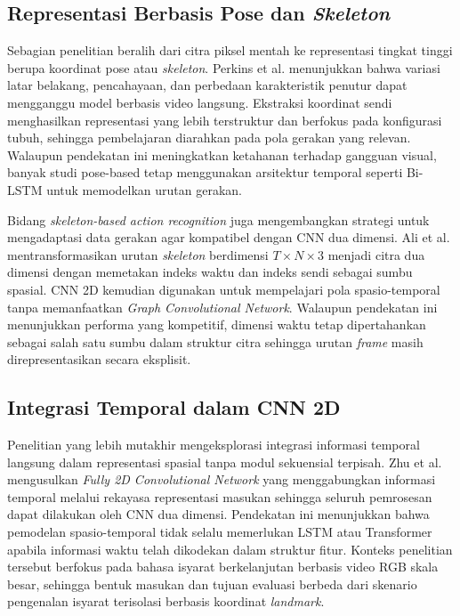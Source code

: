 \subsection{Representasi Berbasis Pose dan \textit{Skeleton}} \label{subsec:berbasis-pose}

Sebagian penelitian beralih dari citra piksel mentah ke representasi tingkat tinggi berupa koordinat pose atau \textit{skeleton}. 
Perkins et al. \cite{perkins2025islr} menunjukkan bahwa variasi latar belakang, pencahayaan, dan perbedaan karakteristik penutur dapat mengganggu model berbasis video langsung. 
Ekstraksi koordinat sendi menghasilkan representasi yang lebih terstruktur dan berfokus pada konfigurasi tubuh, sehingga pembelajaran diarahkan pada pola gerakan yang relevan. 
Walaupun pendekatan ini meningkatkan ketahanan terhadap gangguan visual, banyak studi pose-based tetap menggunakan arsitektur temporal seperti Bi-LSTM untuk memodelkan urutan gerakan.

Bidang \textit{skeleton-based action recognition} juga mengembangkan strategi untuk mengadaptasi data gerakan agar kompatibel dengan CNN dua dimensi. 
Ali et al. \cite{ali2023skeletonaction} mentransformasikan urutan \textit{skeleton} berdimensi $T \times N \times 3$ menjadi citra dua dimensi dengan memetakan indeks waktu dan indeks sendi sebagai sumbu spasial. 
CNN 2D kemudian digunakan untuk mempelajari pola spasio-temporal tanpa memanfaatkan \textit{Graph Convolutional Network}. 
Walaupun pendekatan ini menunjukkan performa yang kompetitif, dimensi waktu tetap dipertahankan sebagai salah satu sumbu dalam struktur citra sehingga urutan \textit{frame} masih direpresentasikan secara eksplisit.

\subsection{Integrasi Temporal dalam CNN 2D} \label{subsec:temporal-cnn}

Penelitian yang lebih mutakhir mengeksplorasi integrasi informasi temporal langsung dalam representasi spasial tanpa modul sekuensial terpisah. 
Zhu et al. \cite{zhu2023f2dcnet} mengusulkan \textit{Fully 2D Convolutional Network} yang menggabungkan informasi temporal melalui rekayasa representasi masukan sehingga seluruh pemrosesan dapat dilakukan oleh CNN dua dimensi. 
Pendekatan ini menunjukkan bahwa pemodelan spasio-temporal tidak selalu memerlukan LSTM atau Transformer apabila informasi waktu telah dikodekan dalam struktur fitur. 
Konteks penelitian tersebut berfokus pada bahasa isyarat berkelanjutan berbasis video RGB skala besar, sehingga bentuk masukan dan tujuan evaluasi berbeda dari skenario pengenalan isyarat terisolasi berbasis koordinat \textit{landmark}.

